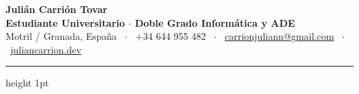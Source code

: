 \documentclass[10pt,a4paper]{article}
\begin{document}
\begin{center}
    \vspace*{-10pt}
    {\huge \bfseries \color{primary} Julián Carrión Tovar} \\[4pt]
    {\large \bfseries \color{accent} Estudiante Universitario $\cdot$ Doble Grado Informática y ADE} \\[6pt]
    {\small \color{textcolor} Motril / Granada, España \ $\cdot$ \ +34 644 955 482 \ $\cdot$ \ \href{mailto:carrionjuliann@gmail.com}{carrionjuliann@gmail.com} \ $\cdot$ \ \href{https://juliancarrion.dev}{juliancarrion.dev}}
\end{center}

\vspace{-6pt}
\hrule height 1pt
\vspace{10pt}
\end{document}
